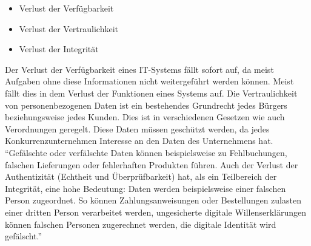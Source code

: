 \begin{itemize}
	\item Verlust der Verfügbarkeit
	\item Verlust der Vertraulichkeit
	\item Verlust der Integrität
\end{itemize}

Der Verlust der Verfügbarkeit eines IT-Systems fällt sofort auf, da meist Aufgaben ohne diese Informationen nicht weitergeführt werden können. Meist fällt dies in dem Verlust der Funktionen eines Systems auf. Die Vertraulichkeit von personenbezogenen Daten ist ein bestehendes Grundrecht jedes Bürgers beziehungsweise jedes Kunden. Dies ist in verschiedenen Gesetzen wie auch Verordnungen geregelt. Diese Daten müssen geschützt werden, da jedes Konkurrenzunternehmen Interesse an den Daten des Unternehmens hat. \enquote{Gefälschte oder verfälschte Daten können beispielsweise zu Fehlbuchungen, falschen Lieferungen oder fehlerhaften Produkten führen. Auch der Verlust der Authentizität (Echtheit und Überprüfbarkeit) hat, als ein Teilbereich der Integrität, eine hohe Bedeutung: Daten werden beispielsweise einer falschen Person zugeordnet. So können Zahlungsanweisungen oder Bestellungen zulasten einer dritten Person verarbeitet werden, ungesicherte digitale Willenserklärungen können falschen Personen zugerechnet werden, die digitale Identität wird	gefälscht.}\autocite[][S.\,1]{bundesamt_fur_sicherheit_in_der_informationstechnik_bsi_it-grundschutz-kompendium_2020}

